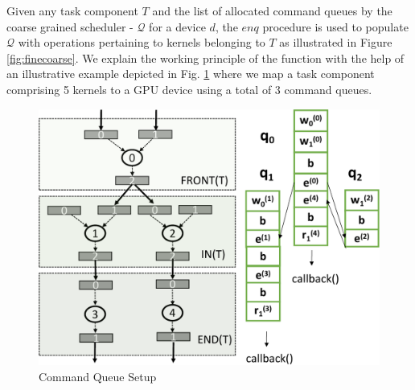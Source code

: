    Given any task component $T$ and the list of allocated command queues by the coarse grained scheduler - $\mathcal{Q}$ for a device $d$, the $enq$ procedure is used to populate  $\mathcal{Q}$ with operations pertaining to kernels belonging to $T$ as illustrated in Figure \ref{fig:finecoarse}.  We explain the working principle of the function with the help of an illustrative example depicted in Fig. \ref{fig:dispatch} where we map a task component comprising 5 kernels to a GPU device using a total of 3 command queues. 
	\begin{figure}[ht]
		\centering
		\includegraphics[scale=0.45]{Pictures/TaskObject.pdf}
		\caption{\small Command Queue Setup\label{fig:dispatch}}
	\end{figure}
